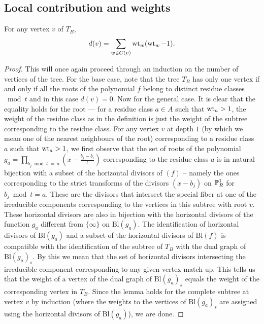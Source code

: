 \subsection{Local contribution and weights}
\begin{lemma}\label{formulaford}
 For any vertex $v$ of $T_B$, 
 \[ d(v) = \sum_{w \in C(v)} \wt_w(\wt_w-1) .\] 
\end{lemma}
\begin{proof}
This will once again proceed through an induction on the number of vertices of the tree. For the base case, note that the tree $T_B$ has only one vertex if and only if all the roots of the polynomial $f$ belong to distinct residue classes $\bmod t$ and in this case $d(v) = 0$. Now for the general case. It is clear that the equality holds for the root --- for a residue class $a \in A$ such that $\wt_a > 1$, the weight of the residue class as in the definition is just the weight of the subtree corresponding to the residue class. For any vertex $v$ at depth $1$ (by which we mean one of the nearest neighbours of the root) corresponding to a residue class $a$ such that $\wt_a > 1$, we first observe that the set of roots of the polynomial $\displaystyle{g_a = \prod_{b_j \bmod t \ = \ a} (x- \tfrac{b_j -b_i }{t})}$ corresponding to the residue class $a$ is in natural bijection with a subset of the horizontal divisors of $(f)$ -- namely the ones corresponding to the strict transforms of the divisors $(x-b_j )$ on $\P^1_R$ for $b_j \bmod t = a$. These are the divisors that intersect the special fiber at one of the irreducible components corresponding to the vertices in this subtree with root $v$. These horizontal divisors are also in bijection with the horizontal divisors of the function $g_a$ different from $\overline{\{\infty\}}$ on $\mathrm{Bl}(g_a)$. The identification of horizontal divisors of $\mathrm{Bl}(g_a)$ and a subset of the horizontal divisors of $\mathrm{Bl}(f)$ is compatible with the identification of the subtree of $T_B$ with the dual graph of $\mathrm{Bl}(g_a)_s$. By this we mean that the set of horizontal divisors intersecting the irreducible component corresponding to any given vertex match up. This tells us that the weight of a vertex of the dual graph of $\mathrm{Bl}(g_a)_s$ equals the weight of the corresponding vertex in $T_B$. Since the lemma holds for the complete subtree at vertex $v$ by induction (where the weights to the vertices of $\mathrm{Bl}(g_a)_s$ are assigned using the horizontal divisors of $\mathrm{Bl}(g_a)$), we are done.
\end{proof}

